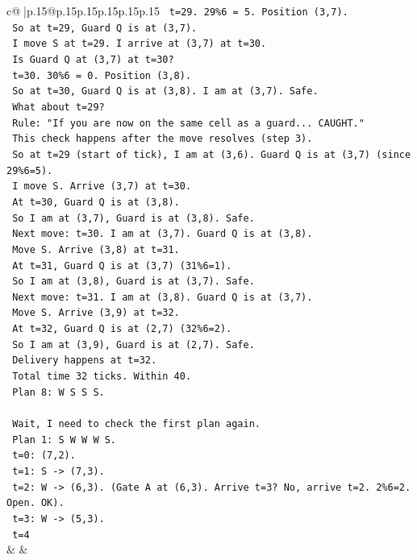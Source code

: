 \documentclass{article}
\begin{document}
{\begin{supertabular}{c@{$\;$}|p{.15\linewidth}@{}p{.15\linewidth}p{.15\linewidth}p{.15\linewidth}p{.15\linewidth}p{.15\linewidth}}
{{{\texttt{    t=29. 29\%6 = 5. Position (3,7).} \\
\texttt{    So at t=29, Guard Q is at (3,7).} \\
\texttt{    I move S at t=29. I arrive at (3,7) at t=30.} \\
\texttt{    Is Guard Q at (3,7) at t=30?} \\
\texttt{    t=30. 30\%6 = 0. Position (3,8).} \\
\texttt{    So at t=30, Guard Q is at (3,8). I am at (3,7). Safe.} \\
\texttt{    What about t=29?} \\
\texttt{    Rule: "If you are now on the same cell as a guard... CAUGHT."} \\
\texttt{    This check happens after the move resolves (step 3).} \\
\texttt{    So at t=29 (start of tick), I am at (3,6). Guard Q is at (3,7) (since 29\%6=5).} \\
\texttt{    I move S. Arrive (3,7) at t=30.} \\
\texttt{    At t=30, Guard Q is at (3,8).} \\
\texttt{    So I am at (3,7), Guard is at (3,8). Safe.} \\
\texttt{    Next move: t=30. I am at (3,7). Guard Q is at (3,8).} \\
\texttt{    Move S. Arrive (3,8) at t=31.} \\
\texttt{    At t=31, Guard Q is at (3,7) (31\%6=1).} \\
\texttt{    So I am at (3,8), Guard is at (3,7). Safe.} \\
\texttt{    Next move: t=31. I am at (3,8). Guard Q is at (3,7).} \\
\texttt{    Move S. Arrive (3,9) at t=32.} \\
\texttt{    At t=32, Guard Q is at (2,7) (32\%6=2).} \\
\texttt{    So I am at (3,9), Guard is at (2,7). Safe.} \\
\texttt{    Delivery happens at t=32.} \\
\texttt{    Total time 32 ticks. Within 40.} \\
\texttt{    Plan 8: W S S S.} \\
\\ 
\texttt{    Wait, I need to check the first plan again.} \\
\texttt{    Plan 1: S W W W S.} \\
\texttt{    t=0: (7,2).} \\
\texttt{    t=1: S {-}> (7,3).} \\
\texttt{    t=2: W {-}> (6,3). (Gate A at (6,3). Arrive t=3? No, arrive t=2. 2\%6=2. Open. OK).} \\
\texttt{    t=3: W {-}> (5,3).} \\
\texttt{    t=4} \\
            }
        }
    }
    & & \\ \\


\end{supertabular}}
\end{document}
